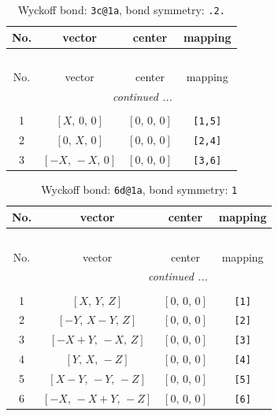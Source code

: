 \documentclass[fleqn,8pt]{jsarticle}
\begin{document}
\renewcommand{\arraystretch}{1.2}
\begin{longtable}{cccc}
\caption{Wyckoff bond: {\tt 3c@1a}, bond symmetry: {\tt .2.}}
 \\
 \hline \hline
No. & vector & center & mapping \\ \hline \endfirsthead

\multicolumn{3}{l}{\tablename\ \thetable{}} \\
 \hline \hline
No. & vector & center & mapping \\ \hline \endhead

 \hline \hline
\multicolumn{3}{r}{\footnotesize\it continued ...} \\ \endfoot

 \hline \hline
\multicolumn{3}{r}{} \\ \endlastfoot

1 & $\left[ X,\, 0,\, 0 \right]$ & $\left[ 0,\, 0,\, 0 \right]$ & {\tt [1,5]} \\ \hline
2 & $\left[ 0,\, X,\, 0 \right]$ & $\left[ 0,\, 0,\, 0 \right]$ & {\tt [2,4]} \\ \hline
3 & $\left[ - X,\, - X,\, 0 \right]$ & $\left[ 0,\, 0,\, 0 \right]$ & {\tt [3,6]} \\
\end{longtable}
\renewcommand{\arraystretch}{1.2}
\begin{longtable}{cccc}
\caption{Wyckoff bond: {\tt 6d@1a}, bond symmetry: {\tt 1}}
 \\
 \hline \hline
No. & vector & center & mapping \\ \hline \endfirsthead

\multicolumn{3}{l}{\tablename\ \thetable{}} \\
 \hline \hline
No. & vector & center & mapping \\ \hline \endhead

 \hline \hline
\multicolumn{3}{r}{\footnotesize\it continued ...} \\ \endfoot

 \hline \hline
\multicolumn{3}{r}{} \\ \endlastfoot

1 & $\left[ X,\, Y,\, Z \right]$ & $\left[ 0,\, 0,\, 0 \right]$ & {\tt [1]} \\ \hline
2 & $\left[ - Y,\, X - Y,\, Z \right]$ & $\left[ 0,\, 0,\, 0 \right]$ & {\tt [2]} \\ \hline
3 & $\left[ - X + Y,\, - X,\, Z \right]$ & $\left[ 0,\, 0,\, 0 \right]$ & {\tt [3]} \\ \hline
4 & $\left[ Y,\, X,\, - Z \right]$ & $\left[ 0,\, 0,\, 0 \right]$ & {\tt [4]} \\ \hline
5 & $\left[ X - Y,\, - Y,\, - Z \right]$ & $\left[ 0,\, 0,\, 0 \right]$ & {\tt [5]} \\ \hline
6 & $\left[ - X,\, - X + Y,\, - Z \right]$ & $\left[ 0,\, 0,\, 0 \right]$ & {\tt [6]} \\
\end{longtable}
\end{document}
